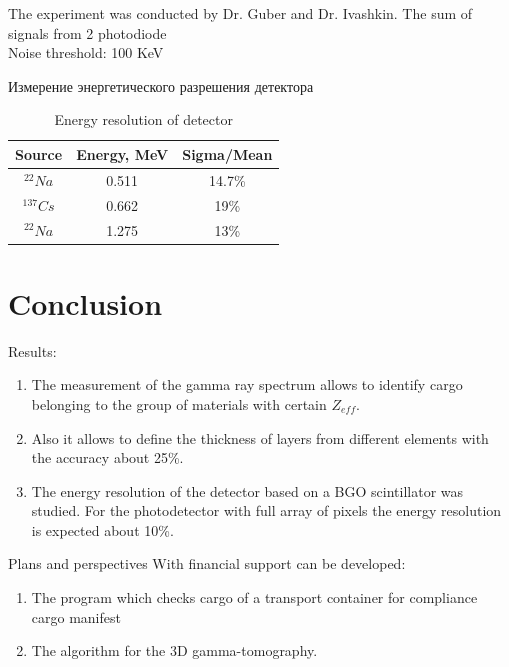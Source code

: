 \documentclass[a4paper]{panl}
\begin{document}
The experiment was conducted by Dr. Guber and Dr. Ivashkin.
The sum of signals from 2 photodiode\\
Noise threshold: 100 KeV\\
\begin{table}
    \caption{Измерение энергетического разрешения детектора }
    \begin{center} 
        \begin{tabular}[c]{|c|c|c|}
            
            \hline 
            Source & Energy, MeV & Sigma/Mean \\
            \hline 
            $^{22}Na$&0.511 & 14.7\%  \\ 
            \hline 
            $^{137}Cs$&0.662 & 19\%\\ 
            \hline 
            $^{22}Na$& 1.275 & 13\% \\
            \hline 
        \end{tabular} 
    \end{center}
\caption{Energy resolution of detector}
\label{tab:ex}
\end{table}


\section*{Conclusion}
Results:   
    \begin{enumerate}
        \item The measurement of the gamma ray spectrum allows to identify cargo belonging to the group of materials with certain $Z_{eff}$.
        \item Also it allows to define the thickness of layers from different elements with the accuracy about 25\%.
        \item The energy resolution of the detector based on a BGO scintillator was studied.  For the photodetector with full array of pixels the energy resolution is expected about 10\%.
    \end{enumerate}
Plans and perspectives
    With financial support can be developed:
    \begin{enumerate}
        \item The program which checks cargo of a transport container  for compliance cargo manifest
        \item The algorithm for the 3D gamma-tomography.
    \end{enumerate}
\end{document}
